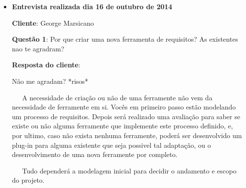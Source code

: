 
\begin{itemize}
	\item \textbf{Entrevista realizada dia 16 de outubro de 2014}

		\textbf{Cliente}: George Marsicano

		\textbf{Questão 1}: Por que criar uma nova ferramenta de requisitos? As existentes nao te agradram?

		\textbf{Resposta do cliente}:

			Não me agradam? *risos*

			\ \ \ A necessidade de criação ou não de uma ferramente não vem da necessidade de ferramente em si.
			Vocês em primeiro passo estão modelando um processo de requisitos. Depois será realizado uma avaliação para saber se existe ou não alguma ferramente que implemente este processo definido, e, por ultimo, caso não exista nenhuma ferramente, poderá ser desenvolvido um plug-in para alguma existente que seja possivel tal adaptação, ou o desenvolvimento de uma nova ferramente por completo.

			\ \ \ Tudo dependerá a modelagem inicial para decidir o andamento e escopo do projeto.
\end{itemize}
